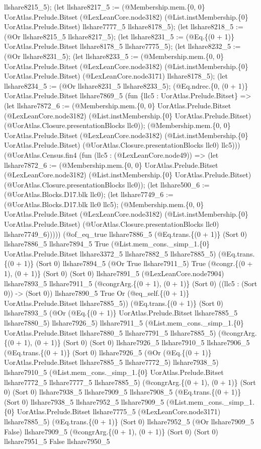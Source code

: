 \documentclass[11pt]{article}
\begin{document}
llshare8215\_5); (let llshare8217\_5 := (@Membership.mem.\{0, 0\} UorAtlas.Prelude.Bitset (@LexLeanCore.node3182) (@List.instMembership.\{0\} UorAtlas.Prelude.Bitset) llshare7777\_5 llshare8178\_5); (let llshare8218\_5 := (@Or llshare8215\_5 llshare8217\_5); (let llshare8231\_5 := (@Eq.\{(0 + 1)\} UorAtlas.Prelude.Bitset llshare8178\_5 llshare7775\_5); (let llshare8232\_5 := (@Or llshare8231\_5); (let llshare8233\_5 := (@Membership.mem.\{0, 0\} UorAtlas.Prelude.Bitset (@LexLeanCore.node3182) (@List.instMembership.\{0\} UorAtlas.Prelude.Bitset) (@LexLeanCore.node3171) llshare8178\_5); (let llshare8234\_5 := (@Or llshare8231\_5 llshare8233\_5); (@Eq.ndrec.\{0, (0 + 1)\} UorAtlas.Prelude.Bitset llshare7869\_5 (fun \{llc5 : UorAtlas.Prelude.Bitset\} => (let llshare7872\_6 := (@Membership.mem.\{0, 0\} UorAtlas.Prelude.Bitset (@LexLeanCore.node3182) (@List.instMembership.\{0\} UorAtlas.Prelude.Bitset) (@UorAtlas.Closure.presentationBlocks llc0)); (@Membership.mem.\{0, 0\} UorAtlas.Prelude.Bitset (@LexLeanCore.node3182) (@List.instMembership.\{0\} UorAtlas.Prelude.Bitset) (@UorAtlas.Closure.presentationBlocks llc0) llc5))) (@UorAtlas.Census.fin4 (fun (llc5 : (@LexLeanCore.node49)) => (let llshare7872\_6 := (@Membership.mem.\{0, 0\} UorAtlas.Prelude.Bitset (@LexLeanCore.node3182) (@List.instMembership.\{0\} UorAtlas.Prelude.Bitset) (@UorAtlas.Closure.presentationBlocks llc0)); (let llshare500\_6 := (@UorAtlas.Blocks.D17.blk llc0); (let llshare7749\_6 := (@UorAtlas.Blocks.D17.blk llc0 llc5); (@Membership.mem.\{0, 0\} UorAtlas.Prelude.Bitset (@LexLeanCore.node3182) (@List.instMembership.\{0\} UorAtlas.Prelude.Bitset) (@UorAtlas.Closure.presentationBlocks llc0) llshare7749\_6))))) (@of\_eq\_true llshare7886\_5 (@Eq.trans.\{(0 + 1)\} (Sort 0) llshare7886\_5 llshare7894\_5 True (@List.mem\_cons.\_simp\_1.\{0\} UorAtlas.Prelude.Bitset llshare3372\_5 llshare7882\_5 llshare7885\_5) (@Eq.trans.\{(0 + 1)\} (Sort 0) llshare7894\_5 (@Or True llshare7911\_5) True (@congr.\{(0 + 1), (0 + 1)\} (Sort 0) (Sort 0) llshare7891\_5 (@LexLeanCore.node7904) llshare7893\_5 llshare7911\_5 (@congrArg.\{(0 + 1), (0 + 1)\} (Sort 0) ((llc5 : (Sort 0)) -> (Sort 0)) llshare7890\_5 True Or (@eq\_self.\{(0 + 1)\} UorAtlas.Prelude.Bitset llshare7885\_5)) (@Eq.trans.\{(0 + 1)\} (Sort 0) llshare7893\_5 (@Or (@Eq.\{(0 + 1)\} UorAtlas.Prelude.Bitset llshare7885\_5 llshare7880\_5) llshare7926\_5) llshare7911\_5 (@List.mem\_cons.\_simp\_1.\{0\} UorAtlas.Prelude.Bitset llshare7880\_5 llshare7791\_5 llshare7885\_5) (@congrArg.\{(0 + 1), (0 + 1)\} (Sort 0) (Sort 0) llshare7926\_5 llshare7910\_5 llshare7906\_5 (@Eq.trans.\{(0 + 1)\} (Sort 0) llshare7926\_5 (@Or (@Eq.\{(0 + 1)\} UorAtlas.Prelude.Bitset llshare7885\_5 llshare7772\_5) llshare7938\_5) llshare7910\_5 (@List.mem\_cons.\_simp\_1.\{0\} UorAtlas.Prelude.Bitset llshare7772\_5 llshare7777\_5 llshare7885\_5) (@congrArg.\{(0 + 1), (0 + 1)\} (Sort 0) (Sort 0) llshare7938\_5 llshare7909\_5 llshare7908\_5 (@Eq.trans.\{(0 + 1)\} (Sort 0) llshare7938\_5 llshare7952\_5 llshare7909\_5 (@List.mem\_cons.\_simp\_1.\{0\} UorAtlas.Prelude.Bitset llshare7775\_5 (@LexLeanCore.node3171) llshare7885\_5) (@Eq.trans.\{(0 + 1)\} (Sort 0) llshare7952\_5 (@Or llshare7909\_5 False) llshare7909\_5 (@congrArg.\{(0 + 1), (0 + 1)\} (Sort 0) (Sort 0) llshare7951\_5 False llshare7950\_5 
\end{document}
